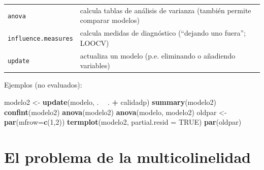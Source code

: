 \documentclass[
]{book}
\newenvironment{Shaded}{\begin{snugshade}}{\end{snugshade}}
\newcommand{\DataTypeTok}[1]{\textcolor[rgb]{0.13,0.29,0.53}{#1}}
\newcommand{\DecValTok}[1]{\textcolor[rgb]{0.00,0.00,0.81}{#1}}
\newcommand{\KeywordTok}[1]{\textcolor[rgb]{0.13,0.29,0.53}{\textbf{#1}}}
\newcommand{\NormalTok}[1]{#1}
\newcommand{\OperatorTok}[1]{\textcolor[rgb]{0.81,0.36,0.00}{\textbf{#1}}}
\newcommand{\OtherTok}[1]{\textcolor[rgb]{0.56,0.35,0.01}{#1}}
\newcommand{\StringTok}[1]{\textcolor[rgb]{0.31,0.60,0.02}{#1}}
\theoremstyle{break}
\theoremstyle{definition}
\theoremstyle{definition}
\theoremstyle{definition}
\theoremstyle{remark}
\begin{document}
\begin{longtable}[]{@{}ll@{}}
\begin{minipage}[t]{0.11\columnwidth}\raggedright
\texttt{anova}\strut
\end{minipage} & \begin{minipage}[t]{0.83\columnwidth}\raggedright
calcula tablas de análisis de varianza (también permite comparar modelos)\strut
\end{minipage}\tabularnewline
\begin{minipage}[t]{0.11\columnwidth}\raggedright
\texttt{influence.measures}\strut
\end{minipage} & \begin{minipage}[t]{0.83\columnwidth}\raggedright
calcula medidas de diagnóstico (``dejando uno fuera''; LOOCV)\strut
\end{minipage}\tabularnewline
\begin{minipage}[t]{0.11\columnwidth}\raggedright
\texttt{update}\strut
\end{minipage} & \begin{minipage}[t]{0.83\columnwidth}\raggedright
actualiza un modelo (p.e. eliminando o añadiendo variables)\strut
\end{minipage}\tabularnewline
\bottomrule
\end{longtable}

Ejemplos (no evaluados):

\begin{Shaded}
\begin{Highlighting}[]
\NormalTok{modelo2 <-}\StringTok{ }\KeywordTok{update}\NormalTok{(modelo, . }\OperatorTok{~}\StringTok{ }\NormalTok{. }\OperatorTok{+}\StringTok{ }\NormalTok{calidadp)}
\KeywordTok{summary}\NormalTok{(modelo2)}
\KeywordTok{confint}\NormalTok{(modelo2)}
\KeywordTok{anova}\NormalTok{(modelo2)}
\KeywordTok{anova}\NormalTok{(modelo, modelo2)}
\NormalTok{oldpar <-}\StringTok{ }\KeywordTok{par}\NormalTok{(}\DataTypeTok{mfrow=}\KeywordTok{c}\NormalTok{(}\DecValTok{1}\NormalTok{,}\DecValTok{2}\NormalTok{))}
\KeywordTok{termplot}\NormalTok{(modelo2, }\DataTypeTok{partial.resid =} \OtherTok{TRUE}\NormalTok{)}
\KeywordTok{par}\NormalTok{(oldpar)}
\end{Highlighting}
\end{Shaded}

\hypertarget{multicolinealidad}{%
\section{El problema de la multicolinelidad}\label{multicolinealidad}}
\end{document}
